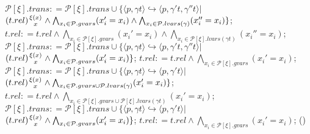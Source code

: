 \documentclass{llncs}
\begin{document}
\begin{algorithm}
{ {
     {
         {
            $\mathcal{P}[\xi].trans\mathrel{\mathop:}=\mathcal{P}[\xi].trans\cup\{\langle p,\gamma t\rangle\hookrightarrow\langle
            p, \gamma't, \gamma''t\rangle|$\\
            \hspace*{\fill} $(t.rel){\xi(x)\atop x}\wedge\bigwedge_{x_i\in\mathcal{P}.gvars}(x_i'=x_i)\wedge\bigwedge_{x_i\in\mathcal{P}.lvars(\gamma)}(x_i''=x_i)
            \}$;
            $t.rel\mathrel{\mathop:}=t.rel\wedge\bigwedge_{x_i\in\mathcal{P}[\xi].gvars}(x_i'=x_i)\wedge\bigwedge_{x_i\in\mathcal{P}[\xi].lvars(\gamma
            t)}(x_i''=x_i)$;
        }
         {
            $\mathcal{P}[\xi].trans\mathrel{\mathop:}=\mathcal{P}[\xi].trans\cup\{\langle p,\gamma t\rangle\hookrightarrow\langle
            p, \gamma't, \gamma''t\rangle|$\\
            \hspace*{2cm}$(t.rel){\xi(x)\atop x}\wedge\bigwedge_{x_i\in\mathcal{P}.gvars}(x_i'=x_i)\}$;
            $t.rel\mathrel{\mathop:}=t.rel\wedge\bigwedge_{x_i\in\mathcal{P}[\xi].gvars}(x_i'=x_i)$;
        }
    }
     {
         {
            $\mathcal{P}[\xi].trans\mathrel{\mathop:}=\mathcal{P}[\xi].trans\cup\{\langle p,\gamma t\rangle\hookrightarrow\langle
            p, \gamma't\rangle|$\\
            \hspace*{2cm}$(t.rel){\xi(x)\atop x}\wedge\bigwedge_{x_i\in\mathcal{P}.gvars\cup\mathcal{P}.lvars(\gamma)}(x_i'=x_i)\}$;
            $t.rel\mathrel{\mathop:}=t.rel\wedge\bigwedge_{x_i\in\mathcal{P}[\xi].gvars\cup \mathcal{P}[\xi].lvars(\gamma t)}(x_i'=x_i)$;
        }
         {
            $\mathcal{P}[\xi].trans\mathrel{\mathop:}=\mathcal{P}[\xi].trans\cup\{\langle p,\gamma t\rangle\hookrightarrow\langle
            p, \gamma't\rangle|$\\
            \hspace*{2cm}$(t.rel){\xi(x)\atop x}\wedge\bigwedge_{x_i\in\mathcal{P}.gvars}(x_i'=x_i)\}$;
            $t.rel\mathrel{\mathop:}=t.rel\wedge\bigwedge_{x_i\in\mathcal{P}[\xi].gvars}(x_i'=x_i)$;
        }
    }
    \Else(){
         {
}}}}
\end{algorithm}
\end{document}
